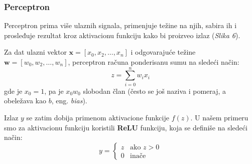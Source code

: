 \documentclass[12pt]{article}
\begin{document}
   \subsubsection*{Perceptron}
    \vspace{-0.5cm}
   Perceptron prima više ulaznih signala, primenjuje težine na njih, 
   sabira ih i prosleđuje rezultat kroz aktivacionu funkciju kako bi proizveo izlaz (\textit{Slika 6}).
   
   Za dat ulazni vektor \(\mathbf{x} = [x_0, x_2, \ldots, x_n]\) i odgovarajuće težine 
   \(\mathbf{w} = [w_0, w_2, \ldots, w_n]\), perceptron računa ponderisanu sumu na sledeći način:
   \[
   z = \sum_{i=0}^{n} w_i x_i
   \]
   gde je \(x_0=1\), pa je $x_0w_0$ slobodan član (često se još naziva i pomeraj, a obeležava kao $b$, eng. \textit{bias}).
   
   Izlaz \(y\) se zatim dobija primenom aktivacione funkcije \(f(z)\). U našem primeru smo za
   aktivacionu funkciju koristili \textbf{ReLU} funkciju, koja se definiše na sledeći način:
   \[
      y = 
      \begin{cases}
         z & \text{ako } z > 0 \\
         0 & \text{inače}
      \end{cases}
      \]
      
\end{document}
